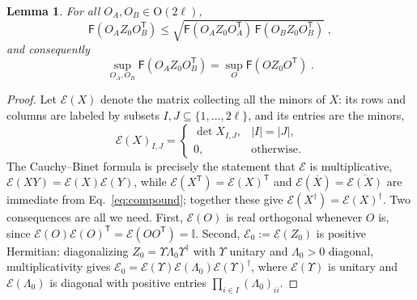 \documentclass[aps,prl,twocolumn,superscriptaddress,reprint,longbibliography,nofootinbib]{revtex4-2}
\newtheorem{lemma}{Lemma}
\newcommand{\trans}{\mathsf{T}}
\begin{document}
\begin{lemma}
\label{lem:two-to-one}
For all $O_A,O_B\in \mathrm{O}(2\ell)$,
\begin{equation}
    \mathsf{F}\!\left(O_AZ_0O_B^{\trans}\right)\le\sqrt{\mathsf{F}\!\left(O_AZ_0O_A^{\trans}\right)\,\mathsf{F}\!\left(O_BZ_0O_B^{\trans}\right)}\;,
    \label{eq:two-to-one}
\end{equation}
and consequently
\begin{equation}
    \sup_{O_A,O_B}\mathsf{F}\!\left(O_AZ_0O_B^{\trans}\right)=\sup_{O}\mathsf{F}\!\left(OZ_0O^{\trans}\right)\;.
    \label{eq:sup-two-to-one}
\end{equation}
\end{lemma}

\begin{proof}
Let $\mathcal{E}(X)$ denote the matrix collecting all the minors of $X$: its rows and columns are labeled by subsets $I,J\subseteq \{1,\dots,2\ell\}$, and its entries are the minors,
\begin{equation}
    \mathcal{E}(X)_{I,J}=\begin{cases}\det X_{I,J}, & |I|=|J|,\\ 0,&\text{otherwise.}\end{cases}
    \label{eq:compound}
\end{equation}
The Cauchy--Binet formula is precisely the statement that $\mathcal{E}$ is multiplicative, $\mathcal{E}(XY)=\mathcal{E}(X)\mathcal{E}(Y)$, while $\mathcal{E}(X^{\trans})=\mathcal{E}(X)^{\trans}$ and $\mathcal{E}(\overline X)=\overline{\mathcal{E}(X)}$ are immediate from Eq.~\eqref{eq:compound}; together these give $\mathcal{E}(X^\dagger)=\mathcal{E}(X)^\dagger$. Two consequences are all we need. First, $\mathcal{E}(O)$ is real orthogonal whenever $O$ is, since $\mathcal{E}(O)\mathcal{E}(O)^{\trans}=\mathcal{E}(OO^{\trans})=\mathbb{I}$. Second, $\mathcal{E}_0:=\mathcal{E}(Z_0)$ is positive Hermitian: diagonalizing $Z_0=\Upsilon\Lambda_0\Upsilon^\dagger$ with $\Upsilon$ unitary and $\Lambda_0>0$  diagonal, multiplicativity gives $\mathcal{E}_0=\mathcal{E}(\Upsilon)\mathcal{E}(\Lambda_0)\mathcal{E}(\Upsilon)^\dagger$, where $\mathcal{E}(\Upsilon)$  is unitary and $\mathcal{E}(\Lambda_0)$ is diagonal with positive entries $\prod_{i\in I}(\Lambda_0)_{ii}$.



\end{proof}
\end{document}
